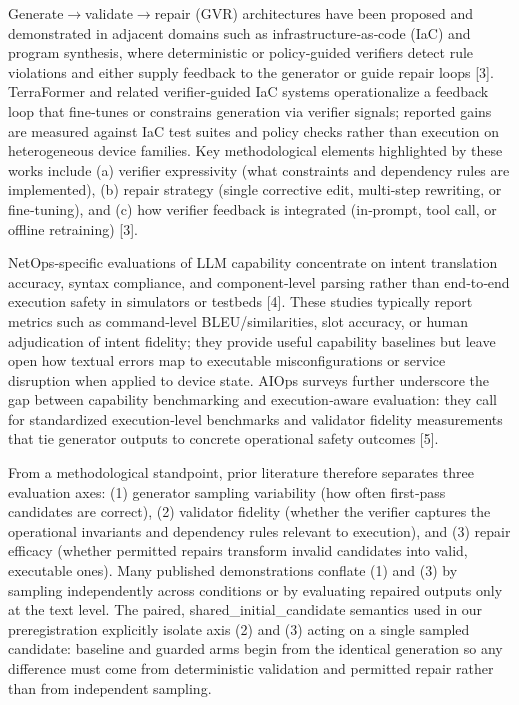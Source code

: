 \documentclass[conference]{IEEEtran}
\begin{document}
Generate\ensuremath{\rightarrow}validate\ensuremath{\rightarrow}repair (GVR) architectures have been proposed and demonstrated in adjacent domains such as infrastructure‑as‑code (IaC) and program synthesis, where deterministic or policy‑guided verifiers detect rule violations and either supply feedback to the generator or guide repair loops [3]. TerraFormer and related verifier‑guided IaC systems operationalize a feedback loop that fine‑tunes or constrains generation via verifier signals; reported gains are measured against IaC test suites and policy checks rather than execution on heterogeneous device families. Key methodological elements highlighted by these works include (a) verifier expressivity (what constraints and dependency rules are implemented), (b) repair strategy (single corrective edit, multi‑step rewriting, or fine‑tuning), and (c) how verifier feedback is integrated (in‑prompt, tool call, or offline retraining) [3].

NetOps‑specific evaluations of LLM capability concentrate on intent translation accuracy, syntax compliance, and component‑level parsing rather than end‑to‑end execution safety in simulators or testbeds [4]. These studies typically report metrics such as command‑level BLEU/similarities, slot accuracy, or human adjudication of intent fidelity; they provide useful capability baselines but leave open how textual errors map to executable misconfigurations or service disruption when applied to device state. AIOps surveys further underscore the gap between capability benchmarking and execution‑aware evaluation: they call for standardized execution‑level benchmarks and validator fidelity measurements that tie generator outputs to concrete operational safety outcomes [5].

From a methodological standpoint, prior literature therefore separates three evaluation axes: (1) generator sampling variability (how often first‑pass candidates are correct), (2) validator fidelity (whether the verifier captures the operational invariants and dependency rules relevant to execution), and (3) repair efficacy (whether permitted repairs transform invalid candidates into valid, executable ones). Many published demonstrations conflate (1) and (3) by sampling independently across conditions or by evaluating repaired outputs only at the text level. The paired, shared\_initial\_candidate semantics used in our preregistration explicitly isolate axis (2) and (3) acting on a single sampled candidate: baseline and guarded arms begin from the identical generation so any difference must come from deterministic validation and permitted repair rather than from independent sampling.
\end{document}
